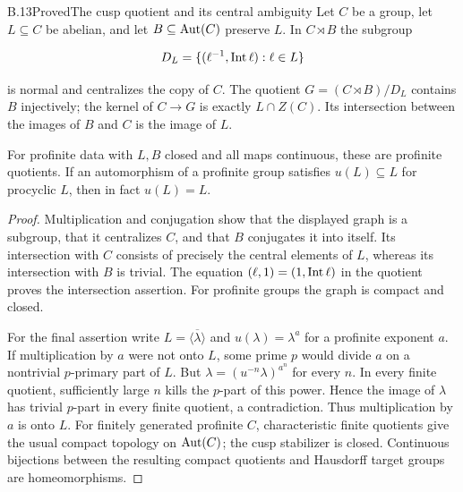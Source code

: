 \begin{statement}{B.13}{Proved}{The cusp quotient and its central ambiguity}
Let $C$ be a group, let $L\subseteq C$ be abelian, and let
$B\subseteq\operatorname{Aut}(C)$ preserve $L$.
In $C\rtimes B$ the subgroup

$$
D_L=\{(\ell^{-1},\operatorname{Int}\ell):\ell\in L\}
$$

is normal and centralizes the copy of $C$.
The quotient $G=(C\rtimes B)/D_L$ contains $B$ injectively;
the kernel of $C\to G$ is exactly $L\cap Z(C)$.
Its intersection between the images of $B$ and $C$ is
the image of $L$.

For profinite data with $L,B$ closed and all maps continuous,
these are profinite quotients. If an automorphism of a
profinite group satisfies $u(L)\subseteq L$ for procyclic
$L$, then in fact $u(L)=L$.
\end{statement}
\begin{proof}
Multiplication and conjugation show that the displayed graph
is a subgroup, that it centralizes $C$, and that $B$ conjugates
it into itself. Its intersection with $C$ consists of precisely
the central elements of $L$, whereas its intersection with
$B$ is trivial. The equation
$(\ell,1)=(1,\operatorname{Int}\ell)$ in the quotient proves the intersection
assertion.
For profinite groups the graph is compact and closed.

For the final assertion write $L=\overline{\langle\lambda\rangle}$
and $u(\lambda)=\lambda^a$ for a profinite exponent $a$.
If multiplication by $a$ were not onto $L$, some prime $p$
would divide $a$ on a nontrivial $p$-primary part of $L$.
But
$\lambda=(u^{-n}\lambda)^{a^n}$
for every $n$. In every finite quotient, sufficiently large
$n$ kills the $p$-part of this power. Hence the image of
$\lambda$ has trivial $p$-part in every finite quotient,
a contradiction. Thus multiplication by $a$ is onto $L$.
For finitely generated profinite $C$, characteristic finite
quotients give the usual compact topology on $\operatorname{Aut}(C)$;
the cusp stabilizer is closed. Continuous bijections between
the resulting compact quotients and Hausdorff target groups
are homeomorphisms.
\end{proof}

